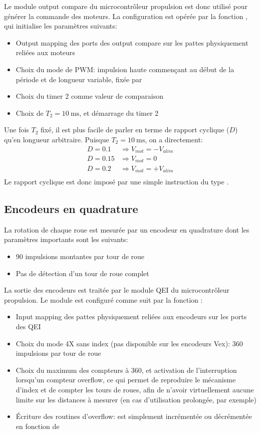 Le module output compare du microcontrôleur propulsion est donc utilisé pour générer la commande des moteurs. La configuration est opérée par la fonction , qui initialise les paramètres suivants:
\begin{itemize}
  \item Output mapping des ports des output compare sur les pattes physiquement reliées aux moteurs
  \item Choix du mode de PWM: impulsion haute commençant au début de la période et de longueur variable, fixée par 
  \item Choix du timer 2 comme valeur de comparaison
  \item Choix de $T_2 = \SI{10}{\milli\second}$, et démarrage du timer 2
\end{itemize}
Une fois $T_2$ fixé, il est plus facile de parler en terme de rapport cyclique ($D$) qu'en longueur arbitraire. Puisque $T_2 = \SI{10}{\milli\second}$, on a directement:
\begin{align*}
  D = 0.1 &\Rightarrow V_{mot} = -V_{alim}\\
  D = 0.15 &\Rightarrow V_{mot} = 0\\
  D = 0.2 &\Rightarrow V_{mot} = +V_{alim}\\
\end{align*}
Le rapport cyclique est donc imposé par une simple instruction du type .

\subsection{Encodeurs en quadrature}
La rotation de chaque roue est mesurée par un encodeur en quadrature dont les paramètres importants sont les suivants:
\begin{itemize}
  \item 90 impulsions montantes par tour de roue
  \item Pas de détection d'un tour de roue complet
\end{itemize}
La sortie des encodeurs est traitée par le module QEI du microcontrôleur propulsion. Le module est configuré comme suit par la fonction :
\begin{itemize}
  \item Input mapping des pattes physiquement reliées aux encodeurs sur les ports des QEI
  \item Choix du mode 4X sans index (pas disponible sur les encodeurs Vex): 360 impulsions par tour de roue
  \item Choix du maximum des compteurs à 360, et activation de l'interruption lorsqu'un compteur overflow, ce qui permet de reproduire le mécanisme d'index et de compter les tours de roues, afin de n'avoir virtuellement aucune limite sur les distances à mesurer (en cas d'utilisation prolongée, par exemple)
  \item \'Ecriture des routines d'overflow:  est simplement incrémentée ou décrémentée en fonction de 
\end{itemize}

